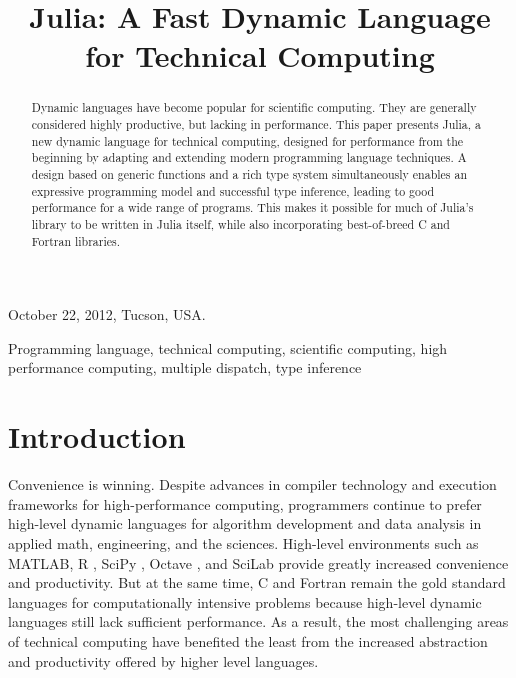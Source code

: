 \documentclass[9pt]{sigplanconf}
\newcommand{\Matlab}{MATLAB\textsuperscript{\tiny\textregistered}}
\begin{document}
               {October 22, 2012, Tucson, USA.}


\title{Julia: A Fast Dynamic Language for Technical Computing}


\maketitle
\begin{abstract}
  Dynamic languages have become popular for scientific computing. They
  are generally considered highly productive, but lacking in performance.
  This paper presents Julia, a new dynamic language for technical
  computing, designed for performance from the beginning by adapting and
  extending modern programming language techniques. A design based on
  generic functions and a rich type system simultaneously enables an
  expressive programming model and successful type inference, leading to
  good performance for a wide range of programs. This makes it possible
  for much of Julia's library to be written in Julia itself, while also
  incorporating best-of-breed C and Fortran libraries.
\end{abstract}



\keywords
Programming language, technical computing, scientific computing, high
performance computing, multiple dispatch, type inference

\section{Introduction}

Convenience is winning. Despite advances in compiler technology and
execution frameworks for high-performance computing, programmers continue
to prefer high-level dynamic languages for algorithm development and data
analysis in applied math, engineering, and the sciences. High-level
environments such as \Matlab, R \cite{Rlang}, SciPy \cite{numpy},
Octave \cite{Octave}, and SciLab \cite{scilab} provide greatly increased
convenience and productivity. But at the same time, C and Fortran
remain the gold standard languages for computationally intensive
problems because high-level dynamic languages still lack sufficient
performance. As a result, the most challenging areas of technical
computing have benefited the least from the increased abstraction and
productivity offered by higher level languages.
\end{document}
